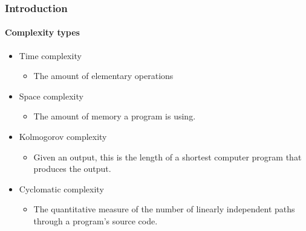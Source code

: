 \begin{frame}
    \frametitle{Introduction}
    \framesubtitle{Complexity types}

    \begin{itemize}[<+->]
        \item Time complexity
        \begin{itemize}
            \item The amount of elementary operations
        \end{itemize}
        \item Space complexity
        \begin{itemize}
            \item The amount of memory a program is using.
        \end{itemize}
        \item Kolmogorov complexity
        \begin{itemize}
            \item Given an output, this is the length of a shortest computer
            program that produces the output.
        \end{itemize}
        \item Cyclomatic complexity
        \begin{itemize}
            \item The quantitative measure of the number of linearly
            independent paths through a program's source code.
        \end{itemize}
    \end{itemize}


\end{frame}
